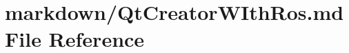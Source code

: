 \hypertarget{QtCreatorWIthRos_8md}{\section{markdown/\-Qt\-Creator\-W\-Ith\-Ros.md File Reference}
\label{QtCreatorWIthRos_8md}
}
